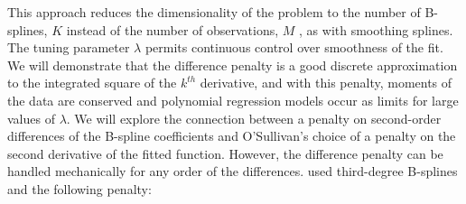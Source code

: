 \documentclass[12pt]{article}
\begin{document}
This approach reduces the dimensionality of the problem to the number of B-splines, $K$ instead of the number of observations, $M$ , as with smoothing splines. The tuning parameter $\lambda$ permits continuous control over smoothness of the fit. We will demonstrate that the difference penalty is a good discrete approximation to the integrated square of the $k^{th}$ derivative, and with this penalty, moments of the data are conserved and polynomial regression models occur as limits for large values of $\lambda$. We will explore the connection between a penalty on second-order differences of the B-spline coefficients and O'Sullivan's choice of a penalty on the second derivative of the fitted function. However, the difference penalty can be handled mechanically for any order of the differences.
\cite{o1986statistical} used third-degree B-splines and the following penalty:
\end{document}
